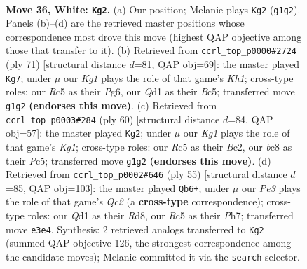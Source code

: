 \documentclass[11pt]{article}
\begin{document}
\begin{figure}[p]\centering
\begin{subfigure}{0.46\textwidth}\centering
\resizebox{\linewidth}{!}{%
\newchessgame
\chessboard[
  setfen={1rb2k2/1p5p/r2n4/2R3p1/q7/4P1P1/P4P1P/B2QR1K1 w - - 0 36},
  showmover=false,
  pgfstyle=straightmove, color=movearrow, markmove={g1-g2}
]}
\caption{}
\end{subfigure}\hfill
\begin{subfigure}{0.46\textwidth}\centering
\resizebox{\linewidth}{!}{%
\newchessgame
\chessboard[
  setfen={q4r1k/7p/3p2p1/2bQp3/2B4P/5PP1/1P6/5R1K b - - 0 36},
  showmover=false,
  pgfstyle=straightmove, color=movearrow, markmove={h8-g7}
]}
\caption{}
\end{subfigure}
\\[4pt]
\begin{subfigure}{0.46\textwidth}\centering
\resizebox{\linewidth}{!}{%
\newchessgame
\chessboard[
  setfen={5rk1/2b3p1/2p3p1/2Pp4/3P1q2/6Q1/2B2P1P/5RK1 w - - 0 31},
  showmover=false,
  pgfstyle=straightmove, color=movearrow, markmove={g1-g2}
]}
\caption{}
\end{subfigure}\hfill
\begin{subfigure}{0.46\textwidth}\centering
\resizebox{\linewidth}{!}{%
\newchessgame
\chessboard[
  setfen={3rr1k1/2q2p1p/p5pB/1p1Qb3/4N3/P6P/1P4P1/3RR1K1 b - - 2 28},
  showmover=false,
  pgfstyle=straightmove, color=movearrow, markmove={c7-b6}
]}
\caption{}
\end{subfigure}
\caption{\textbf{Move 36, White: \texttt{Kg2}.} (a) Our position; Melanie plays \texttt{Kg2} (\texttt{g1g2}). Panels (b)--(d) are the retrieved master positions whose correspondence most drove this move (highest QAP objective among those that transfer to it). (b) Retrieved from \texttt{ccrl\_top\_p0000\#2724} (ply 71) [structural distance $d$=81, QAP obj=69]: the master played \texttt{Kg7}; under $\mu$ our \emph{Kg1} plays the role of that game's \emph{Kh1}; cross-type roles: our \emph{R}c5 as their \emph{P}g6, our \emph{Q}d1 as their \emph{B}c5; transferred move \texttt{g1g2} \textbf{(endorses this move)}. (c) Retrieved from \texttt{ccrl\_top\_p0003\#284} (ply 60) [structural distance $d$=84, QAP obj=57]: the master played \texttt{Kg2}; under $\mu$ our \emph{Kg1} plays the role of that game's \emph{Kg1}; cross-type roles: our \emph{R}c5 as their \emph{B}c2, our \emph{b}c8 as their \emph{P}c5; transferred move \texttt{g1g2} \textbf{(endorses this move)}. (d) Retrieved from \texttt{ccrl\_top\_p0002\#646} (ply 55) [structural distance $d$=85, QAP obj=103]: the master played \texttt{Qb6+}; under $\mu$ our \emph{Pe3} plays the role of that game's \emph{Qc2} (a \textbf{cross-type} correspondence); cross-type roles: our \emph{Q}d1 as their \emph{R}d8, our \emph{R}c5 as their \emph{P}h7; transferred move \texttt{e3e4}. Synthesis: 2 retrieved analogs transferred to \texttt{Kg2} (summed QAP objective 126, the strongest correspondence among the candidate moves); Melanie committed it via the \texttt{search} selector.}
\label{fig:thought-m70}
\end{figure}
\end{document}
